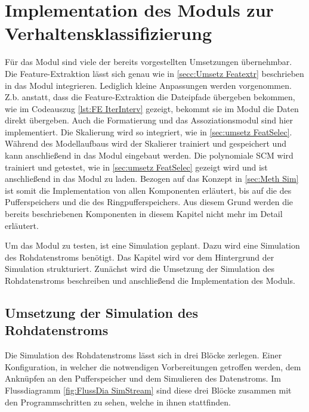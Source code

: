 \section{Implementation des Moduls zur Verhaltensklassifizierung} \label{sec:umse ModulKonzept}
Für das Modul sind viele der bereits vorgestellten Umsetzungen übernehmbar. Die Feature-Extraktion lässt sich genau wie in \ref{secc:Umsetz Featextr} beschrieben in das Modul integrieren. Lediglich kleine Anpassungen werden vorgenommen. Z.b. anstatt, dass die Feature-Extraktion die Dateipfade übergeben bekommen, wie im Codeauszug \ref{lst:FE IterInterv} gezeigt, bekommt sie im Modul die Daten direkt übergeben. Auch die Formatierung und das Assoziationsmodul sind hier implementiert. Die Skalierung wird so integriert, wie in \ref{sec:umsetz FeatSelec}. Während des Modellaufbaus wird der Skalierer trainiert und gespeichert und kann anschließend in das Modul eingebaut werden. Die polynomiale SCM wird trainiert und getestet, wie in \ref{sec:umsetz FeatSelec} gezeigt wird und ist anschließend in das Modul zu laden. Bezogen auf das Konzept in \ref{sec:Meth Sim} ist somit die Implementation von allen Komponenten erläutert, bis auf die des Pufferspeichers und die des Ringpufferspeichers. Aus diesem Grund werden die bereits beschriebenen Komponenten in diesem Kapitel nicht mehr im Detail erläutert.\par

Um das Modul zu testen, ist eine Simulation geplant. Dazu wird eine Simulation des Rohdatenstroms benötigt. Das Kapitel wird vor dem Hintergrund der Simulation strukturiert. Zunächst wird die Umsetzung der Simulation des Rohdatenstroms beschreiben und anschließend die Implementation des Moduls.

\subsection{Umsetzung der Simulation des Rohdatenstroms}
Die Simulation des Rohdatenstroms lässt sich in drei Blöcke zerlegen. Einer Konfiguration, in welcher die notwendigen Vorbereitungen getroffen werden, dem Anknüpfen an den Pufferspeicher und dem Simulieren des Datenstroms. Im Flussdiagramm \ref{fig:FlussDia SimStream} sind diese drei Blöcke zusammen mit den Programmschritten zu sehen, welche in ihnen stattfinden. \par


